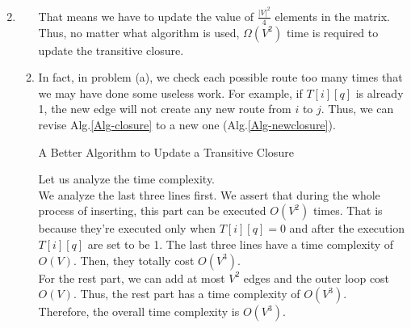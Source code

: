 \documentclass[12pt,a4paper]{article}
\makeatletter
\newtheorem*{solution}{Solution}
\theoremstyle{definition}
\renewenvironment{solution}[1][Solution] {\par\pushQED{\qed}\normalfont\topsep6\p@\@plus6\p@\relax\trivlist\item[\hskip\labelsep\bfseries#1\@addpunct{.}]\ignorespaces}{\popQED\endtrivlist\@endpefalse} \makeatother
\makeatother
\begin{document}
\begin{enumerate}
\begin{solution}
\begin{enumerate}
    That means we have to update the value of $\frac{|V|^2}{4}$ elements in the matrix. Thus, no matter what algorithm is used, $\Omega(V^2)$ time is required to update the transitive closure. 
    
    \item
    In fact, in problem (a), we check each possible route too many times that we may have done some useless work. For example, if $T[i][q]$ is already 1, the new edge will not create any new route from $i$ to $j$. Thus, we can revise Alg.\ref{Alg-closure} to a new one (Alg.\ref{Alg-newclosure}).
    
    \begin{minipage}[t]{0.85\textwidth}
        \begin{algorithm}[H]
        
        \BlankLine
        \caption{A Better Algorithm to Update a Transitive Closure}
        \label{Alg-newclosure}
        \end{algorithm}
        \end{minipage}
    
        Let us analyze the time complexity. \\
        We analyze the last three lines first. We assert that during the whole process of inserting, this part can be executed $O(V^2)$ times. That is because they're executed only when $T[i][q]=0$ and after the execution $T[i][q]$ are set to be 1. The last three lines have a time complexity of $O(V)$. Then, they totally cost $O(V^3)$.\\
        For the rest part, we can add at most $V^2$ edges and the outer loop cost $O(V)$. Thus, the rest part has a time complexity of $O(V^3)$.\\
        Therefore, the overall time complexity is $O(V^3)$.
	\end{enumerate}
	\end{solution}
	

\end{enumerate}
\end{document}
